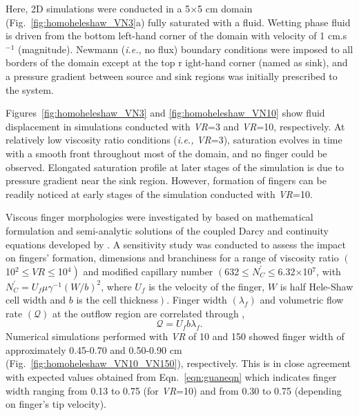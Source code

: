 \documentclass[preprint,authoryear,12pt]{elsarticle}
\newcommand{\ie}{{\it i.e., }}
\begin{document}
Here, 2D simulations were conducted in a 5$\times$5 cm domain (Fig.~\ref{fig:homoheleshaw_VN3}a) fully saturated with a fluid. Wetting phase fluid is driven from the bottom left-hand corner of the domain with velocity of 1 cm.s$^{-1}$ (magnitude). Newmann (\ie no flux) boundary conditions were imposed to all borders of the domain except at the top r ight-hand corner (named as sink), and a pressure gradient between source and sink regions was initially prescribed to the system. 

Figures~\ref{fig:homoheleshaw_VN3} and \ref{fig:homoheleshaw_VN10} show fluid displacement in simulations conducted with {\it VR}=3 and {\it VR}=10, respectively. At relatively low viscosity ratio conditions (\ie {\it VR}=3), saturation evolves in time with a smooth front throughout most of the domain, and no finger could be observed. Elongated saturation profile at later stages of the simulation is due to pressure gradient near the sink region. However, formation of fingers can be readily noticed at early stages of the simulation conducted with {\it VR}=10. 

Viscous finger morphologies were investigated by \citet{guan_2003} based on mathematical formulation and semi-analytic solutions of the coupled Darcy and continuity equations developed by \citet{mclean_1981}. A sensitivity study was conducted to assess the impact on fingers' formation, dimensions and branchiness for a range of viscosity ratio $\left(\right.$10$^{2}\le\textit{VR}\le$10$\left.^{4}\right)$ and modified capillary number $\left(\right.$632$\le N_{C}^{'}\le$6.32$\times$10$^{7}$, with $N_{C}^{'}= U_{f}\mu\gamma^{-1}(W/b)^{2}$, where $U_{f}$ is the velocity of the finger, $W$ is half Hele-Shaw cell width and $b$ is the cell thickness$\left.\right)$. Finger width $\left(\lambda_{f}\right)$ and volumetric flow rate $\left(\mathcal{Q}\right)$ at the outflow region are correlated through \citep{guan_2003}, 
\begin{equation} 
   \mathcal{Q} = U_{f} b \lambda_{f}.\label{eqn:guaneqn} 
\end{equation} 
Numerical simulations performed with {\it VR} of 10 and 150 showed finger width of approximately 0.45-0.70 and 0.50-0.90 cm (Fig.~\ref{fig:homoheleshaw_VN10_VN150}), respectively. This is in close agreement with expected values obtained from Eqn.~\ref{eqn:guaneqn} which indicates finger width ranging from 0.13 to 0.75 (for {\it VR}=10) and from 0.30 to 0.75 (depending on finger's tip velocity). 
\end{document}
